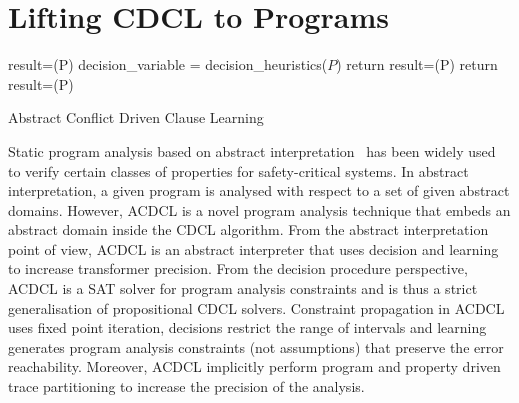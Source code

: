 \section{Lifting CDCL to Programs}
%
\begin{algorithm2e}[t]
\DontPrintSemicolon
{}
\begin{small}
\assign result=\deduce(P)\;
 {
  \return \safe \;
}
\uElse
{
   {
    \return \unsafe \;
  }
}
{
  \assign decision\_variable = decision\_heuristics($P$)\;
  {
    return \unknown\; 
  }
  \uElse
  {
    \assign result=\deduce(P)\;
    {
       {
        \return \unsafe \;
      }
      \uElse 
      {
        \continue\;
      }
    }
    \uElse
    {
       {
         {
          return \safe \;  
        }
        \assign result=\deduce(P)\;
      }
    }
  }
}
\end{small}
\caption{Abstract Conflict Driven Clause Learning\label{Alg:acdcl}}
\end{algorithm2e}
%
Static program analysis based on abstract
interpretation~\cite{DBLP:conf/emsoft/Cousot07} has been widely used to
verify certain classes of properties for safety-critical systems.  In
abstract interpretation, a given program is analysed with respect to a set
of given abstract domains.  However, ACDCL is a novel program analysis 
technique that embeds an abstract domain inside the CDCL algorithm.
From the abstract interpretation point of view, ACDCL is an abstract 
interpreter that uses decision and learning to increase transformer precision. 
From the decision procedure perspective, ACDCL is a SAT solver for program 
analysis constraints and is thus a strict generalisation of propositional CDCL solvers.
Constraint propagation in ACDCL uses fixed point iteration, decisions restrict the 
range of intervals and learning generates program analysis constraints (not assumptions) 
that preserve the error reachability.  Moreover, ACDCL implicitly 
perform program and property driven trace partitioning to increase the precision
of the analysis.  

